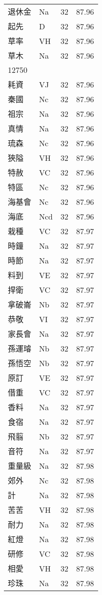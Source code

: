 \documentclass[twocolumn]{book}
\begin{document}
\begin{supertabular}{llrr}
退休金 & Na & 32 &  87.96\\
起先 & D & 32 &  87.96\\
草率 & VH & 32 &  87.96\\
草木 & Na & 32 &  87.96\\
12750\\
耗資 & VJ & 32 &  87.96\\
秦國 & Nc & 32 &  87.96\\
祖宗 & Na & 32 &  87.96\\
真情 & Na & 32 &  87.96\\
琉森 & Nc & 32 &  87.96\\
狹隘 & VH & 32 &  87.96\\
特赦 & VC & 32 &  87.96\\
特區 & Nc & 32 &  87.96\\
海基會 & Nc & 32 &  87.96\\
海底 & Ncd & 32 &  87.96\\
栽種 & VC & 32 &  87.97\\
時鐘 & Na & 32 &  87.97\\
時節 & Na & 32 &  87.97\\
料到 & VE & 32 &  87.97\\
捍衛 & VC & 32 &  87.97\\
拿破崙 & Nb & 32 &  87.97\\
恭敬 & VI & 32 &  87.97\\
家長會 & Na & 32 &  87.97\\
孫運璿 & Nb & 32 &  87.97\\
孫悟空 & Nb & 32 &  87.97\\
原訂 & VE & 32 &  87.97\\
借重 & VC & 32 &  87.97\\
香料 & Na & 32 &  87.97\\
食宿 & Na & 32 &  87.97\\
飛翦 & Nb & 32 &  87.97\\
音符 & Na & 32 &  87.97\\
重量級 & Na & 32 &  87.98\\
郊外 & Nc & 32 &  87.98\\
計 & Na & 32 &  87.98\\
苦苦 & VH & 32 &  87.98\\
耐力 & Na & 32 &  87.98\\
紅燈 & Na & 32 &  87.98\\
研修 & VC & 32 &  87.98\\
相愛 & VH & 32 &  87.98\\
珍珠 & Na & 32 &  87.98\\

\end{supertabular}
\end{document}
